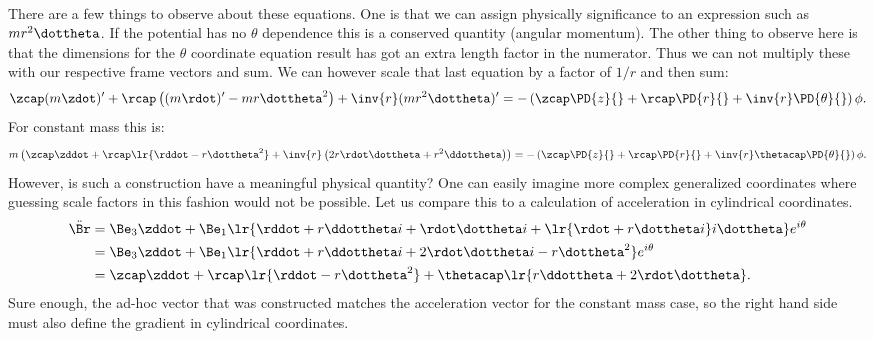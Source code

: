 {\begin{equation}
\begin{aligned}
\end{aligned}
\end{equation}
%
There are a few things to observe about these equations.  One is that we can assign physically significance to an expression such as \(m r^2 \dottheta\).  If the potential has no \(\theta\) dependence this is a conserved quantity (angular momentum).
%
The other thing to observe here is that the dimensions for the \(\theta\) coordinate equation result has got an extra length factor in the numerator.  Thus we can not multiply these with our respective frame vectors and sum.  We can however scale that last equation by a factor of \(1/r\) and then sum:
%
\begin{equation}\label{eqn:tongMf1:1820}
\zcap (m\zdot)' + \rcap \left((m\rdot)' - m r \dottheta^2\right) + \inv{r} (mr^2 \dottheta)' = - \left(\zcap \PD{z}{} + \rcap \PD{r}{} + \inv{r} \PD{\theta}{}\right) \phi.
\end{equation}
%
For constant mass this is:
\begin{equation}\label{eqn:tongMf1:1840}
m \left( \zcap \zddot + \rcap
\lr{ \rddot - r \dottheta^2 }
 + \inv{r} \left(2 r \rdot \dottheta + r^2 \ddottheta\right) \right) = - \left(\zcap \PD{z}{} + \rcap \PD{r}{} + \inv{r} \thetacap \PD{\theta}{}\right) \phi.
\end{equation}
%
However, is such a construction have a meaningful physical quantity?  One can easily imagine more complex generalized coordinates where guessing scale factors in this fashion would not be possible.
%
Let us compare this to a calculation of acceleration in cylindrical coordinates.
%
\begin{equation}\label{eqn:tongMf1:740}
\begin{aligned}
\ddot{\Br} &= \Be_3 \zddot + \Be_1
\lr{ \rddot + r \ddottheta i + \rdot \dottheta i + \lr{ \rdot + r \dottheta i } i\dottheta }
 e^{i\theta} \\
           &= \Be_3 \zddot + \Be_1
\lr{ \rddot + r \ddottheta i + 2 \rdot \dottheta i - r \dottheta^2 }
 e^{i\theta} \\
           &= \zcap \zddot + \rcap
\lr{ \rddot - r \dottheta^2 }
 + \thetacap
\lr{ r \ddottheta + 2 \rdot \dottheta } .
\end{aligned}
\end{equation}
%
Sure enough, the ad-hoc vector that was constructed matches the acceleration vector for the constant mass case, so the right hand side must also define the gradient
in cylindrical coordinates.
%
\begin{equation}\label{eqn:tongMf1:760}

\end{equation}}
